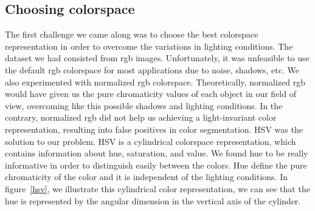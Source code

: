 \documentclass[	DIV=calc,%
							paper=a4,%
							fontsize=11pt,%
							twocolumn]{scrartcl}	 					%
\begin{document}
\subsection{Choosing colorspace}
The first challenge we came along was to choose the best colorspace representation in order to overcome the variations in lighting conditions. The dataset we had consisted from rgb images. Unfortunately, it was unfeasible to use the default rgb colorspace for most applications due to noise, shadows, etc. We also experimented with normalized rgb colorspace. Theoretically,  normalized rgb would have given us the pure chromaticity values of each object in our field of view, overcoming like this possible shadows and lighting conditions. In the contrary, normalized rgb did not help us achieving a light-invariant color representation, resulting into false positives in color segmentation. HSV was the solution to our problem. HSV is a cylindrical colorspace representation, which contains information about hue, saturation, and value. We found hue to be really informative in order to distinguish  easily between the colors. Hue define the pure chromaticity of the color and it is independent of the lighting conditions. In figure~\ref{hsv}, we illustrate this cylindrical color representation, we can see that the hue is represented by the angular dimension in the vertical axis of the cylinder. 
\end{document}

